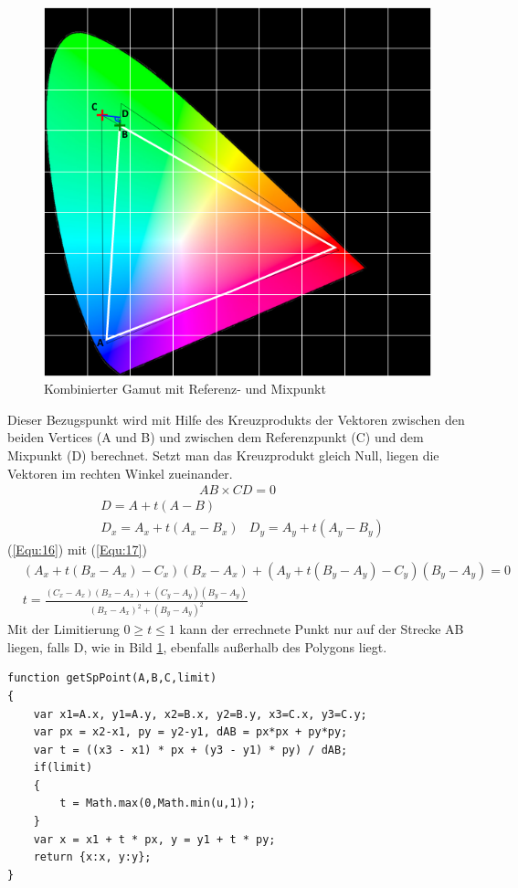 \documentclass[11pt]{scrartcl}
\begin{document}
\begin{figure}[H]
    \begin{center}
        \includegraphics[width=.75\textwidth]{images/combined_gamut_with_mix_point_and_math.png} %
    \end{center}
    \caption{Kombinierter Gamut mit Referenz- und Mixpunkt}\label{fig:refCombined}
\end{figure}
\noindent
Dieser Bezugspunkt wird mit Hilfe des Kreuzprodukts der Vektoren zwischen den beiden Vertices (A und B) und zwischen dem Referenzpunkt (C)
und dem Mixpunkt (D) berechnet. Setzt man das Kreuzprodukt gleich Null, liegen die Vektoren im rechten Winkel zueinander.
\begin{align}\label{Equ:16}
    AB \times CD = 0
\end{align}
\begin{align}\label{Equ:17}
    &D = A + t(A - B)\\
    &D_x = A_x + t(A_x - B_x)
    &D_y = A_y + t(A_y - B_y)
\end{align}
(\ref{Equ:16}) mit (\ref{Equ:17})
\begin{align}\label{Equ:18}
    &(A_x+t(B_x-A_x)-C_x)(B_x-A_x)+(A_y+t(B_y-A_y)-C_y)(B_y-A_y)=0\\
    &t = \frac{(C_x-A_x)(B_x-A_x)+(C_y-A_y)(B_y-A_y)}{(B_x-A_x)^2+(B_y-A_y)^2}
\end{align}
Mit der Limitierung $0 \geq t \leq 1$ kann der errechnete Punkt nur auf der Strecke AB liegen, falls D, wie in Bild \ref{fig:refCombined}, ebenfalls außerhalb des Polygons
liegt.\\
\begin{lstlisting}[caption=Mixpunktermittlung]
function getSpPoint(A,B,C,limit)
{
    var x1=A.x, y1=A.y, x2=B.x, y2=B.y, x3=C.x, y3=C.y;
    var px = x2-x1, py = y2-y1, dAB = px*px + py*py;
    var t = ((x3 - x1) * px + (y3 - y1) * py) / dAB;
    if(limit)
    {
        t = Math.max(0,Math.min(u,1));
    }
    var x = x1 + t * px, y = y1 + t * py;
    return {x:x, y:y};
}
\end{lstlisting}
\end{document}
